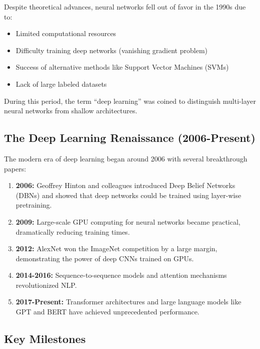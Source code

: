 Despite theoretical advances, neural networks fell out of favor in the 1990s due to:
\begin{itemize}
    \item Limited computational resources
    \item Difficulty training deep networks (vanishing gradient problem)
    \item Success of alternative methods like Support Vector Machines (SVMs)
    \item Lack of large labeled datasets
\end{itemize}

During this period, the term ``deep learning'' was coined to distinguish multi-layer neural networks from shallow architectures.

\subsection{The Deep Learning Renaissance (2006-Present)}

The modern era of deep learning began around 2006 with several breakthrough papers:

\begin{enumerate}
    \item \textbf{2006:} Geoffrey Hinton and colleagues introduced Deep Belief Networks (DBNs) and showed that deep networks could be trained using layer-wise pretraining.
    
    \item \textbf{2009:} Large-scale GPU computing for neural networks became practical, dramatically reducing training times.
    
    \item \textbf{2012:} AlexNet won the ImageNet competition by a large margin, demonstrating the power of deep CNNs trained on GPUs.
    
    \item \textbf{2014-2016:} Sequence-to-sequence models and attention mechanisms revolutionized NLP.
    
    \item \textbf{2017-Present:} Transformer architectures and large language models like GPT and BERT have achieved unprecedented performance.
\end{enumerate}

\subsection{Key Milestones}

